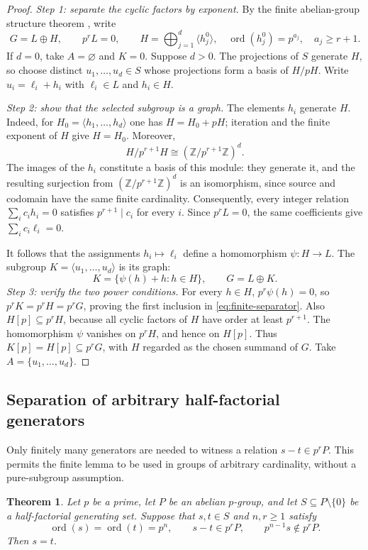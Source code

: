 \documentclass[11pt,reqno]{amsart}
\numberwithin{equation}{section}
\newtheorem{theorem}{Theorem}[section]
\theoremstyle{definition}
\theoremstyle{remark}
\newcommand{\Z}{\mathbb Z}
\DeclareMathOperator{\ord}{ord}
\begin{document}
\begin{proof}
\emph{Step 1: separate the cyclic factors by exponent.}
By the finite abelian-group structure theorem \cite{Fuchs}, write
\[
 G=L\oplus H,\qquad p^rL=0,\qquad
 H=\bigoplus_{j=1}^{d}\langle h_j^0\rangle,
 \quad \ord(h_j^0)=p^{a_j},\quad a_j\ge r+1.
\]
If $d=0$, take $A=\varnothing$ and $K=0$. Suppose $d>0$.
The projections of $S$ generate $H$, so choose distinct
$u_1,\ldots,u_d\in S$ whose projections form a basis of $H/pH$.
Write $u_i=\ell_i+h_i$ with $\ell_i\in L$ and $h_i\in H$.

\emph{Step 2: show that the selected subgroup is a graph.}
The elements $h_i$ generate $H$. Indeed, for
$H_0=\langle h_1,\ldots,h_d\rangle$ one has $H=H_0+pH$;
iteration and the finite exponent of $H$ give $H=H_0$.
Moreover,
\[
 H/p^{r+1}H\cong(\Z/p^{r+1}\Z)^d.
\]
The images of the $h_i$ constitute a basis of this module: they
generate it, and the resulting surjection from
$(\Z/p^{r+1}\Z)^d$ is an isomorphism, since source and codomain
have the same finite cardinality. Consequently, every integer
relation $\sum_i c_ih_i=0$ satisfies
$p^{r+1}\mid c_i$ for every $i$. Since $p^rL=0$, the same
coefficients give $\sum_i c_i\ell_i=0$.

It follows that the assignments $h_i\mapsto\ell_i$ define a
homomorphism $\psi:H\to L$. The subgroup
$K=\langle u_1,\ldots,u_d\rangle$ is its graph:
\[
 K=\{\psi(h)+h:h\in H\},\qquad G=L\oplus K.
\]
\emph{Step 3: verify the two power conditions.}
For every $h\in H$, $p^r\psi(h)=0$, so
$p^rK=p^rH=p^rG$, proving the first inclusion in
\eqref{eq:finite-separator}. Also $H[p]\subseteq p^rH$,
because all cyclic factors of $H$ have order at least $p^{r+1}$.
The homomorphism $\psi$ vanishes on $p^rH$, and hence on $H[p]$.
Thus $K[p]=H[p]\subseteq p^rG$, with $H$ regarded as the chosen
summand of $G$. Take $A=\{u_1,\ldots,u_d\}$.
\end{proof}

\subsection{Separation of arbitrary half-factorial generators}

Only finitely many generators are needed to witness a relation
$s-t\in p^rP$. This permits the finite lemma to be used in groups
of arbitrary cardinality, without a pure-subgroup assumption.

\begin{theorem}\label{thm:generator-separation}
Let $p$ be a prime, let $P$ be an abelian $p$-group, and let
$S\subseteq P\setminus\{0\}$ be a half-factorial generating set.
Suppose that $s,t\in S$ and $n,r\ge1$ satisfy
\begin{equation}\label{eq:generator-separation}
 \ord(s)=\ord(t)=p^n,\qquad
 s-t\in p^rP,\qquad p^{n-1}s\notin p^rP.
\end{equation}
Then $s=t$.
\end{theorem}
\end{document}

